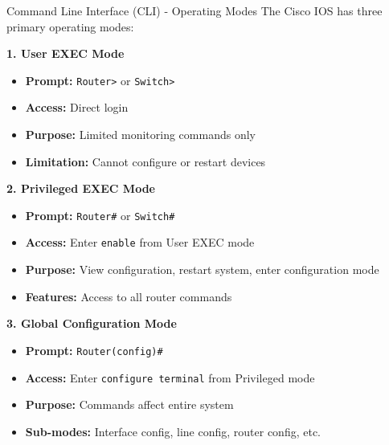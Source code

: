 \documentclass[12pt,a4paper]{article}
\begin{document}
\begin{theorybox}{Command Line Interface (CLI) - Operating Modes}
The Cisco IOS has three primary operating modes:

\vspace{0.2cm}
\textbf{1. User EXEC Mode}
\begin{itemize}[noitemsep]
    \item \textbf{Prompt:} \texttt{Router>} or \texttt{Switch>}
    \item \textbf{Access:} Direct login
    \item \textbf{Purpose:} Limited monitoring commands only
    \item \textbf{Limitation:} Cannot configure or restart devices
\end{itemize}

\vspace{0.2cm}
\textbf{2. Privileged EXEC Mode}
\begin{itemize}[noitemsep]
    \item \textbf{Prompt:} \texttt{Router\#} or \texttt{Switch\#}
    \item \textbf{Access:} Enter \texttt{enable} from User EXEC mode
    \item \textbf{Purpose:} View configuration, restart system, enter configuration mode
    \item \textbf{Features:} Access to all router commands
\end{itemize}

\vspace{0.2cm}
\textbf{3. Global Configuration Mode}
\begin{itemize}[noitemsep]
    \item \textbf{Prompt:} \texttt{Router(config)\#}
    \item \textbf{Access:} Enter \texttt{configure terminal} from Privileged mode
    \item \textbf{Purpose:} Commands affect entire system
    \item \textbf{Sub-modes:} Interface config, line config, router config, etc.
\end{itemize}
\end{theorybox}
\end{document}
